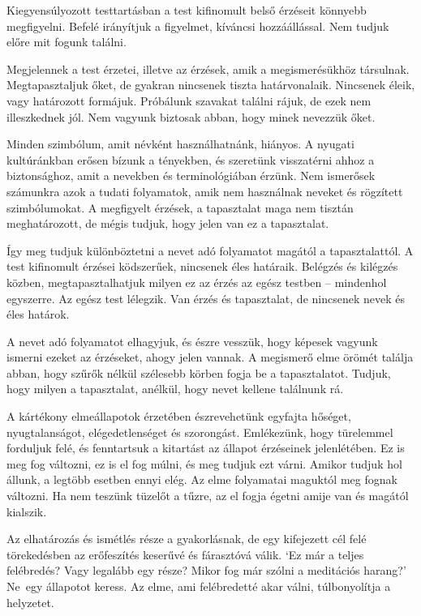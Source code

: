 Kiegyensúlyozott testtartásban a test kifinomult belső érzéseit könnyebb
megfigyelni. Befelé irányítjuk a figyelmet, kíváncsi hozzáállással. Nem
tudjuk előre mit fogunk találni.

Megjelennek a test érzetei, illetve az érzések, amik a megismerésükhöz
társulnak. Megtapasztaljuk őket, de gyakran nincsenek tiszta
határvonalaik. Nincsenek éleik, vagy határozott formájuk. Próbálunk
szavakat találni rájuk, de ezek nem illeszkednek jól. Nem vagyunk
biztosak abban, hogy minek nevezzük őket.

\enlargethispage*{\baselineskip}

Minden szimbólum, amit névként használhatnánk, hiányos. A nyugati
kultúránkban erősen bízunk a tényekben, és szeretünk visszatérni ahhoz a
biztonsághoz, amit a nevekben és terminológiában érzünk. Nem ismerősek
számunkra azok a tudati folyamatok, amik nem használnak neveket és
rögzített szimbólumokat. A megfigyelt érzések, a tapasztalat maga nem
tisztán meghatározott, de mégis tudjuk, hogy jelen van ez a tapasztalat.

Így meg tudjuk különböztetni a nevet adó folyamatot magától a
tapasztalattól. A test kifinomult érzései ködszerűek, nincsenek éles
határaik. Belégzés és kilégzés közben, megtapasztalhatjuk milyen ez az
érzés az egész testben -- mindenhol egyszerre. Az egész test lélegzik.
Van érzés és tapasztalat, de nincsenek nevek és éles határok.

A nevet adó folyamatot elhagyjuk, és észre vesszük, hogy képesek vagyunk
ismerni ezeket az érzéseket, ahogy jelen vannak. A megismerő elme örömét
találja abban, hogy szűrők nélkül szélesebb körben fogja be a
tapasztalatot. Tudjuk, hogy milyen a tapasztalat, anélkül, hogy nevet
kellene találnunk rá.


A kártékony elmeállapotok érzetében észrevehetünk egyfajta hőséget,
nyugtalanságot, elégedetlenséget és szorongást. Emlékezünk, hogy
türelemmel forduljuk felé, és fenntartsuk a kitartást az állapot
érzéseinek jelenlétében. Ez is meg fog változni, ez is el fog múlni, és
meg tudjuk ezt várni. Amikor tudjuk hol állunk, a legtöbb esetben ennyi
elég. Az elme folyamatai maguktól meg fognak változni. Ha nem teszünk
tüzelőt a tűzre, az el fogja égetni amije van és magától kialszik.

Az elhatározás és ismétlés része a gyakorlásnak, de egy kifejezett cél
felé törekedésben az erőfeszítés keserűvé és fárasztóvá válik. `Ez már a
teljes felébredés? Vagy legalább egy része? Mikor fog már szólni a
meditációs harang?' Ne~egy állapotot keress. Az elme, ami felébredetté
akar válni, túlbonyolítja a helyzetet.

